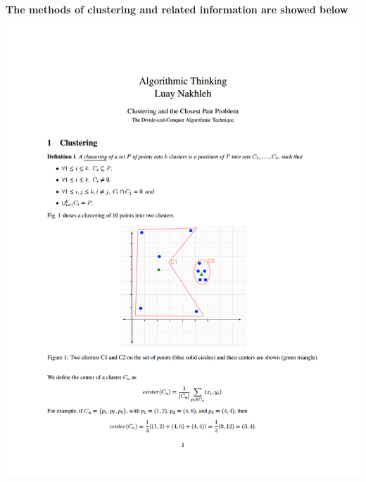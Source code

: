 \documentclass[11pt]{article}
\makeatletter
\def\maxwidth{\ifdim\Gin@nat@width>\linewidth\linewidth
    \else\Gin@nat@width\fi}
\let\Oldincludegraphics\includegraphics
\renewcommand{\includegraphics}[1]{\Oldincludegraphics[width=.8\maxwidth]{#1}}
\makeatother
\begin{document}
    \textbf{The methods of clustering and related information are showed
below} \includegraphics{img/cluster_1.png}
\end{document}
